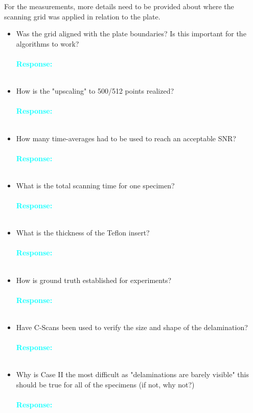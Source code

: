 \documentclass[11pt,a2paper]{report}
\begin{document}
	For the measurements, more details need to be provided about where the scanning grid was applied in relation to the plate. 
	\begin{itemize}
		\item Was the grid aligned with the plate boundaries? Is this important for the algorithms to work?
			\\ \\
		\textcolor{Cyan}{
			\textbf{Response:}}
		\\ \\
		\item How is the "upscaling" to 500/512 points realized?
			\\ \\
		\textcolor{Cyan}{
			\textbf{Response:}}
		\\ \\
		\item How many time-averages had to be used to reach an acceptable SNR?
			\\ \\
		\textcolor{Cyan}{
			\textbf{Response:}}
		\\ \\
		\item What is the total scanning time for one specimen?
			\\ \\
		\textcolor{Cyan}{
			\textbf{Response:}}
		\\ \\
		\item What is the thickness of the Teflon insert?
			\\ \\
		\textcolor{Cyan}{
			\textbf{Response:}}
		\\ \\
		\item How is ground truth established for experiments?
			\\ \\
		\textcolor{Cyan}{
			\textbf{Response:}}
		\\ \\
		\item Have C-Scans been used to verify the size and shape of the delamination?
			\\ \\
		\textcolor{Cyan}{
			\textbf{Response:}}
		\\ \\
		\item Why is Case II the most difficult as "delaminations are barely visible" this should be true for all of the specimens (if not, why not?)
			\\ \\
		\textcolor{Cyan}{
			\textbf{Response:}}
		\\ \\
	\end{itemize}
\end{document}
